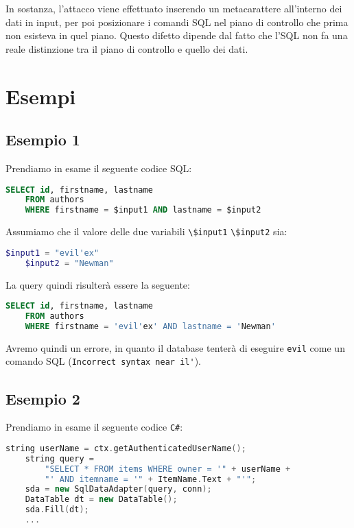 In sostanza, l'attacco viene effettuato inserendo un metacarattere all'interno
dei dati in input, per poi
posizionare i comandi SQL nel piano di controllo che prima non esisteva in quel
piano.
Questo difetto dipende dal fatto che l'SQL non fa una reale distinzione tra il
piano di controllo
e quello dei dati.

\section{Esempi}

\subsection{Esempio 1}

Prendiamo in esame il seguente codice SQL:

\begin{lstlisting}[language=Sql]
    SELECT id, firstname, lastname
    FROM authors
    WHERE firstname = $input1 AND lastname = $input2
\end{lstlisting}

Assumiamo che il valore delle due variabili \verb|\$input1| \verb|\$input2|
sia:

\begin{lstlisting}[language=PHP]
    $input1 = "evil'ex"
    $input2 = "Newman"
\end{lstlisting}

La query quindi risulterà essere la seguente:

\begin{lstlisting}[language=Sql]
    SELECT id, firstname, lastname
    FROM authors
    WHERE firstname = 'evil'ex' AND lastname = 'Newman'
\end{lstlisting}

Avremo quindi un errore, in quanto il database tenterà di eseguire \verb|evil|
come un comando SQL (\verb|Incorrect syntax near il'|).

\subsection{Esempio 2}

Prendiamo in esame il seguente codice \verb|C#|:

\begin{lstlisting}[language=C++]
    string userName = ctx.getAuthenticatedUserName();
    string query = 
        "SELECT * FROM items WHERE owner = '" + userName + 
        "' AND itemname = '" + ItemName.Text + "'";
    sda = new SqlDataAdapter(query, conn);
    DataTable dt = new DataTable();
    sda.Fill(dt);
    ...
\end{lstlisting}

